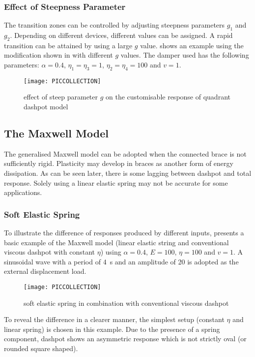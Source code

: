 \subsubsection{Effect of Steepness Parameter}
The transition zones can be controlled by adjusting steepness parameters $g_1$ and $g_2$. Depending on different devices, different values can be assigned. A rapid transition can be attained by using a large $g$ value.  shows an example using the modification shown in  with different $g$ values. The damper used has the following parameters: $\alpha=0.4$, $\eta_1=\eta_3=1$, $\eta_2=\eta_4=100$ and $v=1$.
\begin{figure}[htb]
\centering\scriptsize
\texttt{[image: PICCOLLECTION]}
\caption{effect of steep parameter $g$ on the customisable response of quadrant dashpot model}\label{fig:steep}
\end{figure}
\subsection{The Maxwell Model}
The generalised Maxwell model can be adopted when the connected brace is not sufficiently rigid. Plasticity may develop in braces as another form of energy dissipation. As can be seen later, there is some lagging between dashpot and total response. Solely using a linear elastic spring may not be accurate for some applications.
\subsubsection{Soft Elastic Spring}
To illustrate the difference of responses produced by different inputs,  presents a basic example of the Maxwell model (linear elastic string and conventional viscous dashpot with constant $\eta$) using $\alpha=0.4$, $E=100$, $\eta=100$ and $v=1$. A sinusoidal wave with a period of \SI{4}{\second} and an amplitude of \num{20} is adopted as the external displacement load.
\begin{figure}[htb]
\centering\scriptsize
\texttt{[image: PICCOLLECTION]}
\caption{soft elastic spring in combination with conventional viscous dashpot}\label{fig:maxwell_sep}
\end{figure}
To reveal the difference in a clearer manner, the simplest setup (constant $\eta$ and linear spring) is chosen in this example. Due to the presence of a spring component, dashpot shows an asymmetric response which is not strictly oval (or rounded square shaped).

